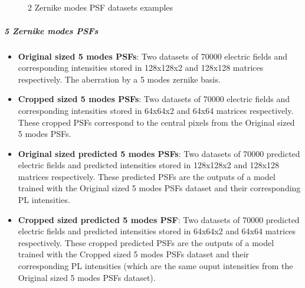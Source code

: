 			\begin{figure*}[ht!]
				\centering
				\\
					
				\\
					
				\\
					
				\\
			\caption{2 Zernike modes PSF datasets examples}
		\end{figure*}
			\FloatBarrier
			
			
			\subparagraph{5 Zernike modes PSFs}
			\begin{itemize}
				\item \textbf{Original sized 5 modes PSFs}: Two datasets of 70000 electric fields and corresponding intensities stored in 128x128x2 and 128x128 matrices respectively. The aberration by a 5 modes zernike basis.		
				\item \textbf{Cropped sized 5 modes PSFs}:  Two datasets of 70000 electric fields and corresponding intensities stored in 64x64x2 and 64x64 matrices respectively. These cropped  PSFs correspond to the central pixels from the Original sized 5 modes PSFs.
				\item \textbf{Original sized predicted 5 modes PSFs}:  Two datasets of 70000 predicted electric fields and predicted intensities stored in 128x128x2 and 128x128 matrices respectively. These predicted PSFs are the outputs of a model trained with the Original sized 5 modes PSFs dataset and their corresponding PL intensities.	
				\item \textbf{Cropped sized predicted 5 modes PSF}: Two datasets of 70000 predicted electric fields and predicted intensities stored in 64x64x2 and 64x64 matrices respectively. These cropped predicted PSFs are the outputs of a model trained with the Cropped sized 5 modes PSFs dataset and their corresponding PL intensities (which are the same ouput intensities from the Original sized 5 modes PSFs dataset).
			\end{itemize}
			
